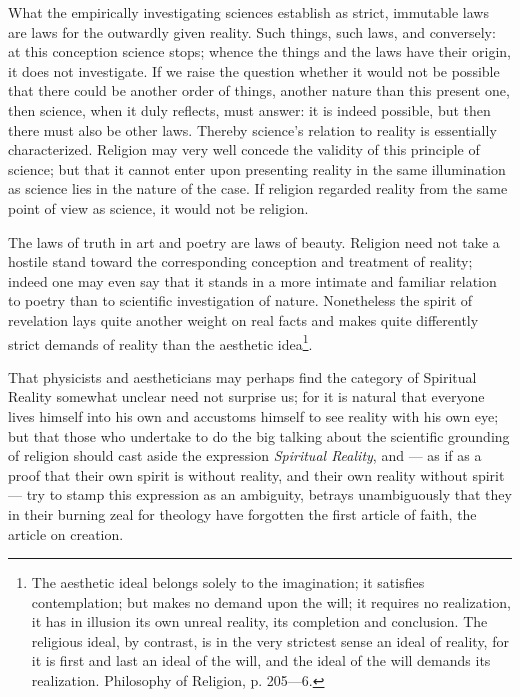 \documentclass[12pt,a4paper,openany]{book}
\newcommand{\opage}[1]{\marginnote{\footnotesize\textit{[#1]}}}
\begin{document}
What the empirically investigating sciences establish
as strict, immutable laws are laws for the outwardly
given reality. Such things, such
\setcounter{footnote}{0}%
\opage{297}laws, and conversely: at this conception science
stops; whence the things and the laws have their
origin, it does not investigate. If we raise the question
whether it would not be possible that there could be
another order of things, another nature than this present one,
then science, when it duly reflects,
must answer: it is indeed possible, but then there must also be
other laws. Thereby science's relation to
reality is essentially characterized. Religion may
very well concede the validity of this principle of science;
but that it cannot enter upon
presenting reality in the same illumination as science
lies in the nature of the case. If religion regarded
reality from the same point of view as science,
it would not be religion.

The laws of truth in art and poetry are laws of beauty.
Religion need not take a hostile stand toward the corresponding
conception and treatment of reality;
indeed one may even say that it stands in a
more intimate and familiar relation to poetry than to
scientific investigation of nature. Nonetheless the spirit of
revelation lays quite another weight on real
facts and makes quite differently strict demands of reality
than the aesthetic idea\footnote[1]{The aesthetic ideal belongs solely to the imagination; it satisfies contemplation; but makes no demand upon the will; it requires no realization, it has in illusion its own unreal reality, its completion and conclusion. The religious ideal, by contrast, is in the very strictest sense an ideal of reality, for it is first and last an ideal of the will, and the ideal of the will demands its realization. Philosophy of Religion, p. 205---6.}.

\setcounter{footnote}{0}%
\opage{298}That physicists and aestheticians may perhaps find
the category of Spiritual Reality somewhat unclear need not surprise
us; for it is natural that everyone lives himself into
his own and accustoms himself to see reality with his own eye;
but that those who undertake to do the big talking about the scientific
grounding of religion should cast aside the expression
\emph{Spiritual Reality}, and --- as if as a proof
that their own spirit is without reality, and their
own reality without spirit --- try to stamp this
expression as an ambiguity, betrays unambiguously that they
in their burning zeal for theology have forgotten the
first article of faith, the article on creation.
\end{document}
